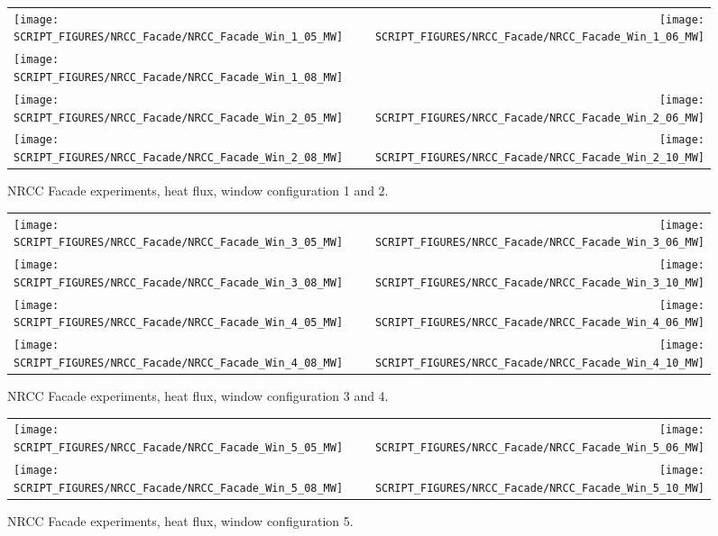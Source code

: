 \newpage

\begin{figure}[p]
\begin{tabular*}{\textwidth}{l@{\extracolsep{\fill}}r}
\texttt{[image: SCRIPT\_FIGURES/NRCC\_Facade/NRCC\_Facade\_Win\_1\_05\_MW]} &
\texttt{[image: SCRIPT\_FIGURES/NRCC\_Facade/NRCC\_Facade\_Win\_1\_06\_MW]} \\
\texttt{[image: SCRIPT\_FIGURES/NRCC\_Facade/NRCC\_Facade\_Win\_1\_08\_MW]} &
  \\
\texttt{[image: SCRIPT\_FIGURES/NRCC\_Facade/NRCC\_Facade\_Win\_2\_05\_MW]} &
\texttt{[image: SCRIPT\_FIGURES/NRCC\_Facade/NRCC\_Facade\_Win\_2\_06\_MW]} \\
\texttt{[image: SCRIPT\_FIGURES/NRCC\_Facade/NRCC\_Facade\_Win\_2\_08\_MW]} &
\texttt{[image: SCRIPT\_FIGURES/NRCC\_Facade/NRCC\_Facade\_Win\_2\_10\_MW]}
\end{tabular*}
\caption{NRCC Facade experiments, heat flux, window configuration 1 and 2.}
\label{NRCC_Facade_1}
\end{figure}

\begin{figure}[p]
\begin{tabular*}{\textwidth}{l@{\extracolsep{\fill}}r}
\texttt{[image: SCRIPT\_FIGURES/NRCC\_Facade/NRCC\_Facade\_Win\_3\_05\_MW]} &
\texttt{[image: SCRIPT\_FIGURES/NRCC\_Facade/NRCC\_Facade\_Win\_3\_06\_MW]} \\
\texttt{[image: SCRIPT\_FIGURES/NRCC\_Facade/NRCC\_Facade\_Win\_3\_08\_MW]} &
\texttt{[image: SCRIPT\_FIGURES/NRCC\_Facade/NRCC\_Facade\_Win\_3\_10\_MW]} \\
\texttt{[image: SCRIPT\_FIGURES/NRCC\_Facade/NRCC\_Facade\_Win\_4\_05\_MW]} &
\texttt{[image: SCRIPT\_FIGURES/NRCC\_Facade/NRCC\_Facade\_Win\_4\_06\_MW]} \\
\texttt{[image: SCRIPT\_FIGURES/NRCC\_Facade/NRCC\_Facade\_Win\_4\_08\_MW]} &
\texttt{[image: SCRIPT\_FIGURES/NRCC\_Facade/NRCC\_Facade\_Win\_4\_10\_MW]}
\end{tabular*}
\caption{NRCC Facade experiments, heat flux, window configuration 3 and 4.}
\label{NRCC_Facade_2}
\end{figure}

\begin{figure}[p]
\begin{tabular*}{\textwidth}{l@{\extracolsep{\fill}}r}
\texttt{[image: SCRIPT\_FIGURES/NRCC\_Facade/NRCC\_Facade\_Win\_5\_05\_MW]} &
\texttt{[image: SCRIPT\_FIGURES/NRCC\_Facade/NRCC\_Facade\_Win\_5\_06\_MW]} \\
\texttt{[image: SCRIPT\_FIGURES/NRCC\_Facade/NRCC\_Facade\_Win\_5\_08\_MW]} &
\texttt{[image: SCRIPT\_FIGURES/NRCC\_Facade/NRCC\_Facade\_Win\_5\_10\_MW]}
\end{tabular*}
\caption{NRCC Facade experiments, heat flux, window configuration 5.}
\label{NRCC_Facade_3}
\end{figure}


